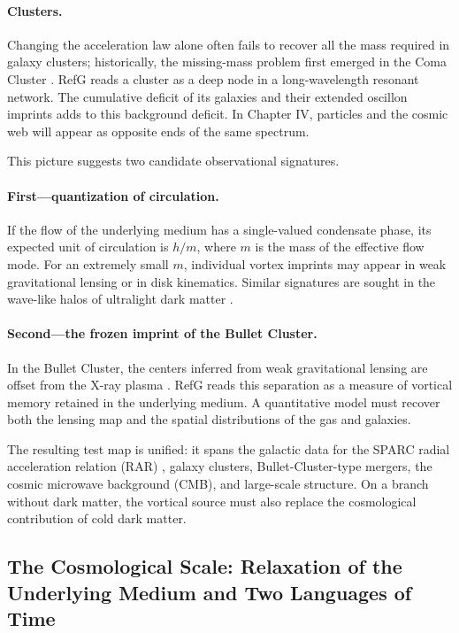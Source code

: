 \documentclass[11pt,a4paper]{article}
\begin{document}
\paragraph{Clusters.}
Changing the acceleration law alone often fails to recover all the mass required in galaxy clusters; historically, the missing-mass problem first emerged in the Coma Cluster \citep{zwicky1933}. RefG reads a cluster as a deep node in a long-wavelength resonant network. The cumulative deficit of its galaxies and their extended oscillon imprints adds to this background deficit. In Chapter IV, particles and the cosmic web will appear as opposite ends of the same spectrum.

This picture suggests two candidate observational signatures.

\paragraph{First---quantization of circulation.}
If the flow of the underlying medium has a single-valued condensate phase, its expected unit of circulation is $h/m$, where $m$ is the mass of the effective flow mode. For an extremely small $m$, individual vortex imprints may appear in weak gravitational lensing or in disk kinematics. Similar signatures are sought in the wave-like halos of ultralight dark matter \citep{hu2000,hui2021}.

\paragraph{Second---the frozen imprint of the Bullet Cluster.}
In the Bullet Cluster, the centers inferred from weak gravitational lensing are offset from the X-ray plasma \citep{clowe2006}. RefG reads this separation as a measure of vortical memory retained in the underlying medium. A quantitative model must recover both the lensing map and the spatial distributions of the gas and galaxies.

The resulting test map is unified: it spans the galactic data for the SPARC radial acceleration relation (RAR) \citep{lelli2016,mcgaugh2016}, galaxy clusters, Bullet-Cluster-type mergers, the cosmic microwave background (CMB), and large-scale structure. On a branch without dark matter, the vortical source must also replace the cosmological contribution of cold dark matter.

\subsection{The Cosmological Scale: Relaxation of the Underlying Medium and Two Languages of Time}
\end{document}
